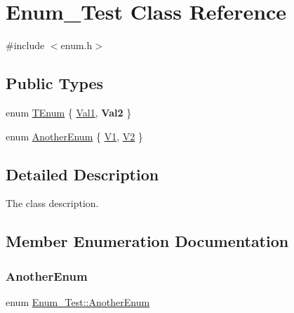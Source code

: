 \hypertarget{class_enum___test}{}\section{Enum\+\_\+\+Test Class Reference}
\label{class_enum___test}


{\ttfamily \#include $<$enum.\+h$>$}

\subsection*{Public Types}
\begin{DoxyCompactItemize}
\item 
enum \mbox{\hyperlink{class_enum___test_a8d096bc026dbb395991f02e3ca86eb1c}{T\+Enum}} \{ \mbox{\hyperlink{class_enum___test_a8d096bc026dbb395991f02e3ca86eb1ca88efe763d7807db8a48f6e685277d7fd}{Val1}}, 
{\bfseries Val2}
 \}
\item 
enum \mbox{\hyperlink{class_enum___test_a633286511e19b996e97699d7dd2cd2a0}{Another\+Enum}} \{ \mbox{\hyperlink{class_enum___test_a633286511e19b996e97699d7dd2cd2a0ab0e5fe049a18d196b564c00bb241722f}{V1}}, 
\mbox{\hyperlink{class_enum___test_a633286511e19b996e97699d7dd2cd2a0ae83b4255ceeedf0c49dd65d1eff8b750}{V2}}
 \}
\end{DoxyCompactItemize}


\subsection{Detailed Description}
The class description. 

\subsection{Member Enumeration Documentation}
\mbox{\label{class_enum___test_a633286511e19b996e97699d7dd2cd2a0}} 
\subsubsection{\texorpdfstring{AnotherEnum}{AnotherEnum}}
{\footnotesize\ttfamily enum \mbox{\hyperlink{class_enum___test_a633286511e19b996e97699d7dd2cd2a0}{Enum\+\_\+\+Test\+::\+Another\+Enum}}}

